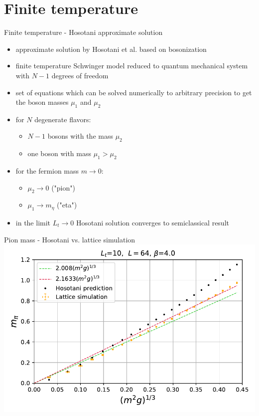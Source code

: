 \documentclass[english]{beamer}
\begin{document}
  
\section{Finite temperature}

\begin{frame}{Finite temperature - Hosotani approximate solution}
  \begin{itemize}
    \item approximate solution by Hosotani et al.
      based on bosonization
    \item finite temperature Schwinger model reduced to quantum
      mechanical system with $N - 1$ degrees of freedom
    \item set of equations which can be solved numerically to 
      arbitrary precision to get the boson masses $\mu_1$ and
      $\mu_2$
    \item for $N$ degenerate flavors:
      \begin{itemize}
         \item $N-1$ bosons with the mass $\mu_2$
         \item one boson with mass $\mu_1 > \mu_2$
      \end{itemize}
    \item for the fermion mass $m\rightarrow0$:
      \begin{itemize}
        \item $\mu_2 \rightarrow 0$ ("pion")
        \item $\mu_1 \rightarrow m_\eta$ ("eta")
      \end{itemize}
    \item in the limit $L_t \rightarrow 0$ Hosotani solution
      converges to semiclassical result
  \end{itemize}
\end{frame}

\begin{frame}{Pion mass - Hosotani vs. lattice simulation}
  \includegraphics[width=1\textwidth]{figs/MPi64x10FiniteT}
\end{frame}
\end{document}

